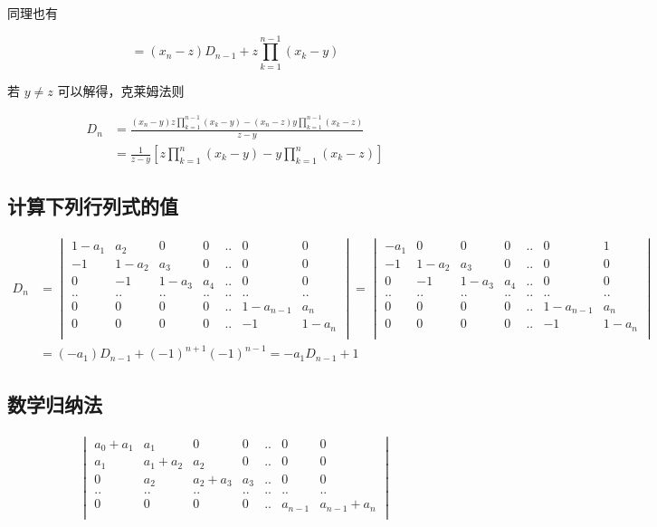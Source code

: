 \documentclass[12pt,a4paper]{ctexart}
\begin{document}
同理也有

\[
= (x_n - z) D_{n-1} + z\prod_{k=1}^{n-1}(x_k - y)
\]

若 $y \ne z$ 可以解得，克莱姆法则

\begin{align*}
D_n &= \frac{(x_n -y)z\prod_{k=1}^{n-1}(x_k -y) - (x_n -z)y \prod_{k=1}^{n-1}(x_k-z)}{z-y} \\
&= \frac{1}{z-y}\left[z\prod_{k=1}^{n}(x_k -y) - y \prod_{k=1}^{n}(x_k-z)\right]
\end{align*}

\subsection{计算下列行列式的值}

\begin{align*}
    D_n &= \begin{vmatrix}
        1-a_1 & a_2 & 0 & 0 & .. & 0 & 0 \\
        -1 & 1-a_2 & a_3 & 0 & .. & 0 & 0 \\
        0 & -1 & 1-a_3 & a_4 & .. & 0 & 0 \\
        .. & .. &.. &.. &.. & .. & ..\\
        0 & 0 & 0 & 0 &.. & 1-a_{n-1} & a_n\\
        0 & 0 & 0 & 0 &.. & -1 & 1-a_n\\
    \end{vmatrix} =     \begin{vmatrix}
        -a_1 & 0 & 0 & 0 & .. & 0 & 1 \\
        -1 & 1-a_2 & a_3 & 0 & .. & 0 & 0 \\
        0 & -1 & 1-a_3 & a_4 & .. & 0 & 0 \\
        .. & .. &.. &.. &.. & .. & ..\\
        0 & 0 & 0 & 0 &.. & 1-a_{n-1} & a_n\\
        0 & 0 & 0 & 0 &.. & -1 & 1-a_n\\
    \end{vmatrix} \\
    &= (-a_1)D_{n-1} + (-1)^{n+1}(-1)^{n-1} = -a_1D_{n-1} + 1
\end{align*}

\subsection{数学归纳法}

\begin{align*}
    \begin{vmatrix}
        a_0 + a_1 & a_1 & 0 & 0 & .. & 0 & 0 \\
        a_1 & a_1 + a_2 & a_2 & 0 & .. & 0 & 0 \\
        0 & a_2 & a_2 + a_3 & a_3 & .. & 0 & 0 \\
        ..& ..&..&..&..& .. & .. \\
        0 & 0 & 0 & 0 & .. & a_{n-1} & a_{n-1} + a_n \\
    \end{vmatrix}
\end{align*}
\end{document}
